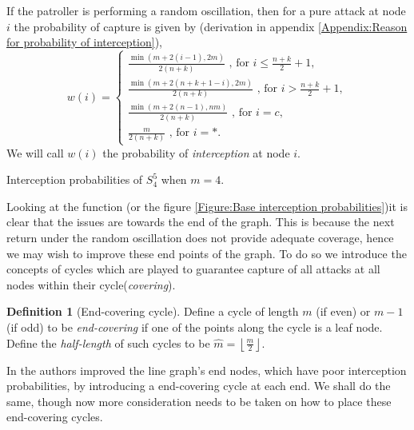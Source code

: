 \documentclass[a4paper,10pt]{article}
\newcommand{\floor}[1]{\left \lfloor #1 \right \rfloor}
\theoremstyle{definition}
\newtheorem{definition}[theorem]{Definition}
\theoremstyle{definition}
\theoremstyle{remark}
\theoremstyle{definition}
\begin{document}
If the patroller is performing a random oscillation, then for a pure attack at node $i$ the probability of capture is given by (derivation in appendix \ref{Appendix:Reason for probability of interception}),
\begin{equation}
\label{eq:Prob of Interception}
w(i)= \left\{\begin{array}{l}
 \frac{\min(m+2(i-1),2m)}{2(n+k)} \text{  , for } i \leq \frac{n+k}{2} +1, \\
 \frac{\min(m+2(n+k+1-i),2m)}{2(n+k)} \text{  , for } i > \frac{n+k}{2} +1, \\
 \frac{\min(m+2(n-1),nm)}{2(n+k)} \text{  , for } i=c, \\
 \frac{m}{2(n+k)} \text{  , for } i=*. 
\end{array} \right.
\end{equation}
We will call $w(i)$ the probability of \textit{interception} at node $i$.

\begin{myfigure}
\begin{center}

\end{center}
\caption{Interception probabilities of $S^5_{4}$ when $m=4$.}
\label{Figure:Base interception probabilities}
\end{myfigure}

Looking at the function (or the figure \ref{Figure:Base interception probabilities})it is clear that the issues are towards the end of the graph. This is because the next return under the random oscillation does not provide adequate coverage, hence we may wish to improve these end points of the graph. To do so we introduce the concepts of cycles which are played to guarantee capture of all attacks at all nodes within their cycle(\textit{covering}).

\begin{definition}[End-covering cycle]
Define a cycle of length $m$ (if even) or $m-1$ (if odd) to be \textit{end-covering} if one of the points along the cycle is a leaf node. Define the \textit{half-length} of such cycles to be $\hat{m}=\floor{\frac{m}{2}}$.
\end{definition}

In \cite{Papadaki2016} the authors improved the line graph's end nodes, which have poor interception probabilities, by introducing a end-covering cycle at each end. We shall do the same, though now more consideration needs to be taken on how to place these end-covering cycles. 
\end{document}
